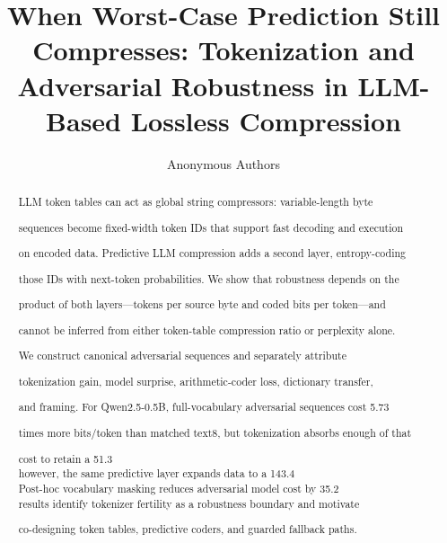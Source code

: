 \documentclass{article}
\title{When Worst-Case Prediction Still Compresses: Tokenization and Adversarial Robustness in LLM-Based Lossless Compression}
\author{Anonymous Authors}
\begin{document}
\maketitle

\begin{abstract}

LLM token tables can act as global string compressors: variable-length byte

sequences become fixed-width token IDs that support fast decoding and execution

on encoded data. Predictive LLM compression adds a second layer, entropy-coding

those IDs with next-token probabilities. We show that robustness depends on the

product of both layers---tokens per source byte and coded bits per token---and

cannot be inferred from either token-table compression ratio or perplexity alone.

We construct canonical adversarial sequences and separately attribute

tokenization gain, model surprise, arithmetic-coder loss, dictionary transfer,

and framing. For Qwen2.5-0.5B, full-vocabulary adversarial sequences cost 5.73

times more bits/token than matched text8, but tokenization absorbs enough of that

cost to retain a 51.3\\%

however, the same predictive layer expands data to a 143.4\\%

Post-hoc vocabulary masking reduces adversarial model cost by 35.2\\%

results identify tokenizer fertility as a robustness boundary and motivate

co-designing token tables, predictive coders, and guarded fallback paths.

\end{abstract}



\end{document}
